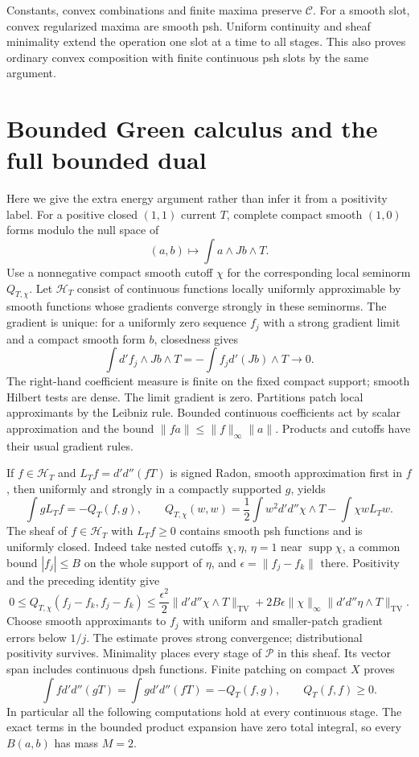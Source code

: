 \documentclass[11pt]{article}
\newcommand{\DD}{d'd''}
\newcommand{\C}{\mathcal C}
\newcommand{\HH}{\mathscr H}
\theoremstyle{remark}\newtheorem{remark}[theorem]{Remark}
\begin{document}
Constants, convex combinations and finite maxima preserve $\C$.
For a smooth slot, convex regularized maxima are smooth psh.
Uniform continuity and sheaf minimality extend the operation one
slot at a time to all stages. This also proves ordinary convex
composition with finite continuous psh slots by the same argument.

\section{Bounded Green calculus and the full bounded dual}
Here we give the extra energy argument rather than infer it from
a positivity label. For a positive closed $(1,1)$ current $T$,
complete compact smooth $(1,0)$ forms modulo the null space of
\[
 (a,b)\longmapsto\int a\wedge Jb\wedge T.
\]
Use a nonnegative compact smooth cutoff $\chi$ for the corresponding
local seminorm $Q_{T,\chi}$. Let $\HH_T$ consist of continuous
functions locally uniformly approximable by smooth functions whose
gradients converge strongly in these seminorms. The gradient is
unique: for a uniformly zero sequence $f_j$ with a strong gradient
limit and a compact smooth form $b$, closedness gives
\[
 \int d'f_j\wedge Jb\wedge T=-\int f_jd'(Jb)\wedge T\longrightarrow0.
\]
The right-hand coefficient measure is finite on the fixed compact
support; smooth Hilbert tests are dense. The limit gradient is zero.
Partitions patch local approximants by the Leibniz rule.
Bounded continuous coefficients act by scalar approximation and the
bound $\|fa\|\le\|f\|_\infty\|a\|$. Products and cutoffs have their
usual gradient rules.

If $f\in\HH_T$ and $L_Tf=\DD(fT)$ is signed Radon, smooth
approximation first in $f$, then uniformly and strongly in a
compactly supported $g$, yields
\[
 \int gL_Tf=-Q_T(f,g),\qquad
 Q_{T,\chi}(w,w)=\frac12\int w^2\DD\chi\wedge T-\int\chi wL_Tw.
\]
The sheaf of $f\in\HH_T$ with $L_Tf\ge0$ contains smooth psh
functions and is uniformly closed. Indeed take nested cutoffs
$\chi,\eta$, $\eta=1$ near $\operatorname{supp}\chi$,
a common bound $|f_j|\le B$ on the whole support of $\eta$, and
$\epsilon=\|f_j-f_k\|$ there. Positivity and the preceding identity give
\[
 0\le Q_{T,\chi}(f_j-f_k,f_j-f_k)
 \le\frac{\epsilon^2}{2}\|\DD\chi\wedge T\|_{\mathrm{TV}}
 +2B\epsilon\|\chi\|_\infty\|\DD\eta\wedge T\|_{\mathrm{TV}}.
\]
Choose smooth approximants to $f_j$ with uniform and smaller-patch
gradient errors below $1/j$. The estimate proves strong convergence;
distributional positivity survives. Minimality places every stage
of $\mathscr P$ in this sheaf. Its vector span includes continuous
dpsh functions. Finite patching on compact $X$ proves
\[
 \int f\DD(gT)=\int g\DD(fT)=-Q_T(f,g),\qquad Q_T(f,f)\ge0.
\]
In particular all the following computations hold at every
continuous stage. The exact terms in the bounded product expansion
have zero total integral, so every $B(a,b)$ has mass $M=2$.
\end{document}
